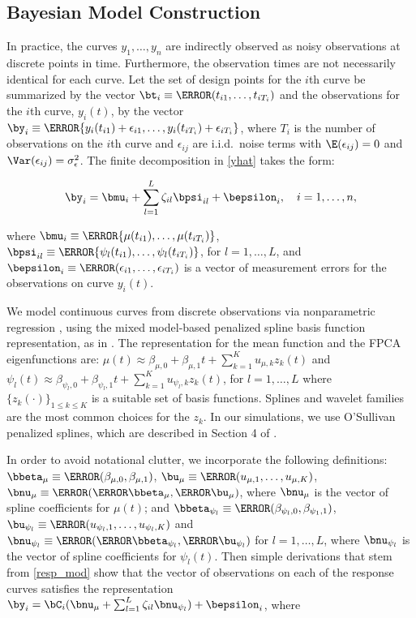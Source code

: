 \documentclass[ba]{imsart}
\numberwithin{equation}{section}
\theoremstyle{plain}
\def\sigsqeps{\sigma^2_{\epsilon}}
\def\betamu{\bbeta_\mu}
\def\umu{\bu_\mu}
\def\numu{\bnu_\mu}
\newcommand\betapsi[1]{\bbeta_{\psi_{#1}}}
\newcommand\upsi[1]{\bu_{\psi_{#1}}}
\newcommand\nupsi[1]{\bnu_{\psi_{#1}}}
\begin{document}

\subsection{Bayesian Model Construction}
\label{sec:bayes_mod}

In practice, the curves $y_1, \dots, y_n$ are indirectly observed as noisy observations at discrete points in time.
Furthermore, the observation times are not necessarily identical for each curve.
Let the set of design points for the $i$th curve be summarized by the vector $\bt_i \equiv \T{(t_{i1}, \dots, t_{iT_i})}$
and the observations for the $i$th curve, $y_i (t)$, by the vector $\by_i \equiv \T{\{ y_i (t_{i1}) + \epsilon_{i1}, \dots, y_i
(t_{iT_i}) + \epsilon_{iT_i} \}}$, where $T_i$ is the number of observations on the $i$th curve and
$\epsilon_{ij}$ are i.i.d.\ noise terms with $\E (\epsilon_{ij}) = 0$ and $\Var (\epsilon_{ij}) = \sigsqeps$.
The finite decomposition in \eqref{yhat} takes the form:

\begin{equation}
	\by_i = \bmu_i + \sum_{l=1}^L \zeta_{il} \bpsi_{il} + \bepsilon_{i}, \quad i = 1, \dots, n,
\label{resp_mod}
\end{equation}

\noindent where $\bmu_i \equiv \T{\{ \mu (t_{i1}), \dots, \mu (t_{iT_i}) \}}$,
$\bpsi_{il} \equiv \T{\{ \psi_l (t_{i1}), \dots, \psi_l (t_{iT_i}) \}}$, for $l = 1, \dots, L$, and
$\bepsilon_{i} \equiv \T{(\epsilon_{i1}, \dots, \epsilon_{iT_i})}$ is a vector of measurement errors
for the observations on curve $y_i (t)$.

We model continuous curves from discrete observations via nonparametric regression \citep{ruppert03, ruppert09},
using the mixed model-based penalized spline basis function representation, as in \citet{durban05}. The
representation for the mean function and the FPCA eigenfunctions are:
$\mu (t) \approx \beta_{\mu, 0} + \beta_{\mu, 1} t + \sum_{k=1}^K u_{\mu, k} z_k (t)$ and
$\psi_l (t) \approx \beta_{\psi_l, 0} + \beta_{\psi_l, 1} t + \sum_{k=1}^K u_{\psi_l, k} z_k (t)$,
for $l = 1, \dots, L$ where $\{ z_k (\cdot) \}_{1 \le k \le K}$ is a suitable set of
basis functions. Splines and wavelet families are the most common choices for the $z_k$. In our simulations, we
use O'Sullivan penalized splines, which are described in Section 4 of \citet{wand08}.

In order to avoid notational clutter, we incorporate the following definitions:
$\betamu \equiv \T{(\beta_{\mu, 0}, \beta_{\mu, 1})}$, $\umu \equiv \T{(u_{\mu, 1}, \dots, u_{\mu, K})}$,
$\numu \equiv \T{(\T{\betamu}, \T{\umu})}$, where $\numu$ is the vector of spline coefficients for $\mu (t)$;
and $\betapsi{l} \equiv \T{(\beta_{\psi_l, 0}, \beta_{\psi_1, 1})}$,
$\upsi{l} \equiv \T{(u_{\psi_l, 1}, \dots, u_{\psi_l, K})}$ and $\nupsi{l} \equiv \T{(\T{\betapsi{l}}, \T{\upsi{l}})}$
for $l = 1, \dots, L$, where $\nupsi{l}$ is the vector of spline coefficients for $\psi_l (t)$.
Then simple derivations that stem from \eqref{resp_mod} show that the vector of observations on
each of the response curves satisfies the representation $\by_i = \bC_i (\numu + \sum_{l=1}^L \zeta_{il} \nupsi{l}) +
\bepsilon_{i}$, where
\end{document}

